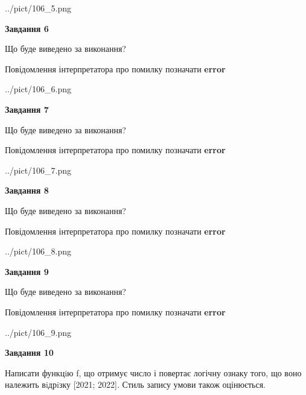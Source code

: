 \documentclass[12pt, ukrainian]{article}
\begin{document}
{\begin {large}
\begin{center}
	{../pict/106_5.png}
\end{center}
\newpage

{\begin {center}\textbf{Завдання 6}\end {center}}\par
Що буде виведено за виконання? \par
Повідомлення інтерпретатора про помилку позначати \textbf{error}

\begin{center}
	{../pict/106_6.png}
\end{center}
\newpage

{\begin {center}\textbf{Завдання 7}\end {center}}\par
Що буде виведено за виконання? \par
Повідомлення інтерпретатора про помилку позначати \textbf{error}

\begin{center}
	{../pict/106_7.png}
\end{center}
\newpage

{\begin {center}\textbf{Завдання 8}\end {center}}\par
Що буде виведено за виконання? \par
Повідомлення інтерпретатора про помилку позначати \textbf{error}

\begin{center}
	{../pict/106_8.png}
\end{center}
\newpage

{\begin {center}\textbf{Завдання 9}\end {center}}\par
Що буде виведено за виконання? \par
Повідомлення інтерпретатора про помилку позначати \textbf{error}

\begin{center}
	{../pict/106_9.png}
\end{center}
\newpage

{\begin {center}\textbf{Завдання 10}\end {center}}\par

Написати функцiю f, що отримує число і повертає логічну ознаку того, що воно належить вiдрiзку [2021; 2022]. Стиль запису умови також оцінюється.\par
\newpage

\end {large}}
\end{document}

